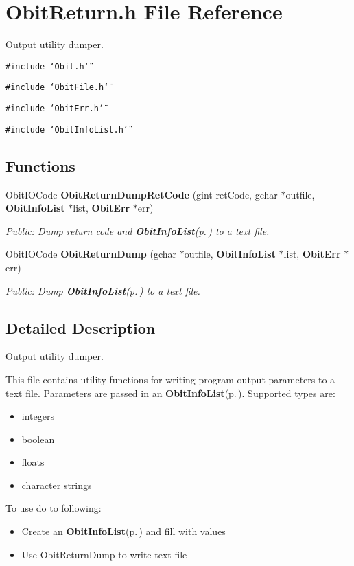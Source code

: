 \section{Obit\-Return.h File Reference}
\label{ObitReturn_8h}
Output utility dumper. 

{\tt \#include \char`\"{}Obit.h\char`\"{}}\par
{\tt \#include \char`\"{}Obit\-File.h\char`\"{}}\par
{\tt \#include \char`\"{}Obit\-Err.h\char`\"{}}\par
{\tt \#include \char`\"{}Obit\-Info\-List.h\char`\"{}}\par
\subsection*{Functions}
\begin{CompactItemize}
\item 
Obit\-IOCode {\bf Obit\-Return\-Dump\-Ret\-Code} (gint ret\-Code, gchar $\ast$outfile, {\bf Obit\-Info\-List} $\ast$list, {\bf Obit\-Err} $\ast$err)
\begin{CompactList}\small\item\em Public: Dump return code and {\bf Obit\-Info\-List}{\rm (p.\,\pageref{structObitInfoList})} to a text file. \item\end{CompactList}\item 
Obit\-IOCode {\bf Obit\-Return\-Dump} (gchar $\ast$outfile, {\bf Obit\-Info\-List} $\ast$list, {\bf Obit\-Err} $\ast$err)
\begin{CompactList}\small\item\em Public: Dump {\bf Obit\-Info\-List}{\rm (p.\,\pageref{structObitInfoList})} to a text file. \item\end{CompactList}\end{CompactItemize}


\subsection{Detailed Description}
Output utility dumper. 

This file contains utility functions for writing program output parameters to a text file. Parameters are passed in an {\bf Obit\-Info\-List}{\rm (p.\,\pageref{structObitInfoList})}. Supported types are: \begin{itemize}
\item integers \item boolean \item floats \item character strings\end{itemize}
To use do to following: \begin{itemize}
\item Create an {\bf Obit\-Info\-List}{\rm (p.\,\pageref{structObitInfoList})} and fill with values \item Use Obit\-Return\-Dump to write text file\end{itemize}
